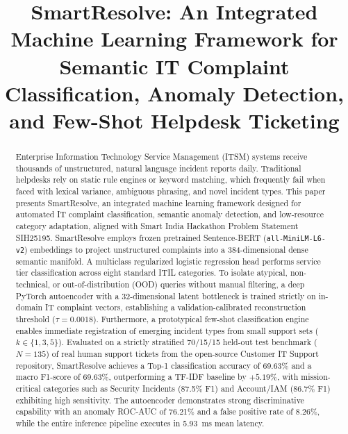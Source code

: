 \documentclass[conference]{IEEEtran}
\begin{document}
\title{SmartResolve: An Integrated Machine Learning Framework for Semantic IT Complaint Classification, Anomaly Detection, and Few-Shot Helpdesk Ticketing}

\author{
\and
{}
}

\maketitle

\begin{abstract}
Enterprise Information Technology Service Management (ITSM) systems receive thousands of unstructured, natural language incident reports daily. Traditional helpdesks rely on static rule engines or keyword matching, which frequently fail when faced with lexical variance, ambiguous phrasing, and novel incident types. This paper presents SmartResolve, an integrated machine learning framework designed for automated IT complaint classification, semantic anomaly detection, and low-resource category adaptation, aligned with Smart India Hackathon Problem Statement SIH25195. SmartResolve employs frozen pretrained Sentence-BERT (\texttt{all-MiniLM-L6-v2}) embeddings to project unstructured complaints into a 384-dimensional dense semantic manifold. A multiclass regularized logistic regression head performs service tier classification across eight standard ITIL categories. To isolate atypical, non-technical, or out-of-distribution (OOD) queries without manual filtering, a deep PyTorch autoencoder with a 32-dimensional latent bottleneck is trained strictly on in-domain IT complaint vectors, establishing a validation-calibrated reconstruction threshold ($\tau = 0.0018$). Furthermore, a prototypical few-shot classification engine enables immediate registration of emerging incident types from small support sets ($k \in \{1, 3, 5\}$). Evaluated on a strictly stratified 70/15/15 held-out test benchmark ($N=135$) of real human support tickets from the open-source Customer IT Support repository, SmartResolve achieves a Top-1 classification accuracy of 69.63\% and a macro F1-score of 69.63\%, outperforming a TF-IDF baseline by $+5.19\%$, with mission-critical categories such as Security Incidents (87.5\% F1) and Account/IAM (86.7\% F1) exhibiting high sensitivity. The autoencoder demonstrates strong discriminative capability with an anomaly ROC-AUC of 76.21\% and a false positive rate of 8.26\%, while the entire inference pipeline executes in 5.93~ms mean latency.
\end{abstract}
\end{document}
